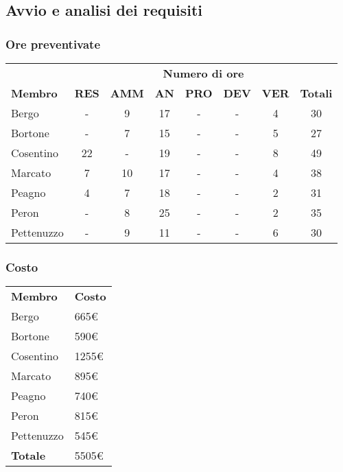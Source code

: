\subsection{Avvio e analisi dei requisiti}
	\subsubsection{Ore preventivate}
		\begin{tabular}{| l | c c c c c c | c |}
			\rowcolor{LightBlue}
			& \multicolumn{7}{c}{\textbf{\color{white}Numero di ore}}	\\
	
			\rowcolor{LightBlue}
			\textbf{\color{white}Membro}
			& \textbf{\color{white}RES}
			& \textbf{\color{white}AMM}
			& \textbf{\color{white}AN}
			& \textbf{\color{white}PRO}
			& \textbf{\color{white}DEV}
			& \textbf{\color{white}VER}
			& \textbf{\color{white}Totali}\\
	
			Bergo & - & 9 & 17 & - & - & 4 & 30\\
			Bortone & - & 7 & 15	& - & - & 5 & 27\\
			Cosentino & 22 & - & 19 & - & - & 8 & 49\\
			Marcato & 7 & 10 & 17 & - & - & 4 & 38\\
			Peagno & 4 & 7 & 18 & - & - & 2 & 31\\
			Peron & - & 8 & 25 & - & - & 2 & 35\\
			Pettenuzzo & - & 9 & 11 & - & - & 6 & 30\\ \hline
		\end{tabular}
	\subsubsection{Costo}
		\begin{tabular}{| l | l |}
			\rowcolor{LightBlue}
			\textbf{\color{white}Membro}
			& \textbf{\color{white}Costo}\\
			
			Bergo & 665€\\
			Bortone & 590€\\
			Cosentino & 1255€\\
			Marcato & 895€\\
			Peagno & 740€\\
			Peron & 815€\\
			Pettenuzzo & 545€\\ \hline
			\textbf{Totale} & 5505€\\ \hline
		\end{tabular}
		
